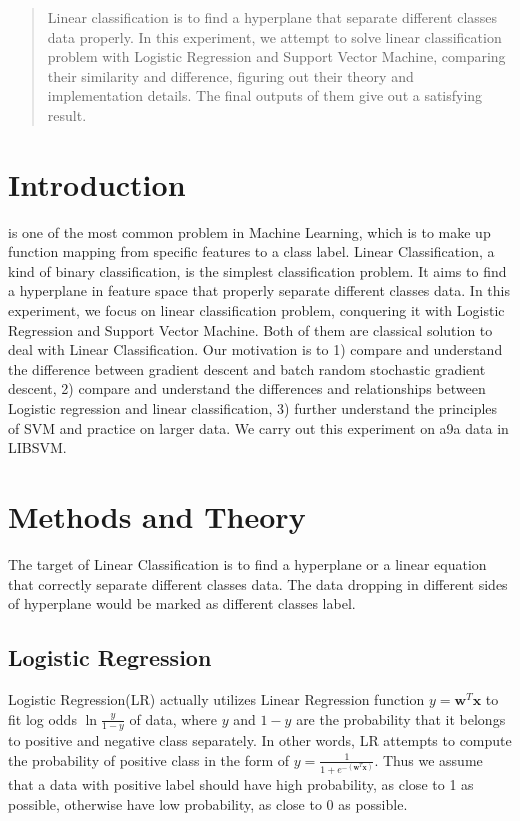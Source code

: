 \documentclass[journal, a4paper]{IEEEtran}
\begin{document}
\begin{abstract}
Linear classification is to find a hyperplane that separate different classes data properly. In this experiment, we attempt to solve linear classification problem with Logistic Regression and Support Vector Machine, comparing their similarity and difference, figuring out their theory and implementation details. The final outputs of them give out a satisfying result.
\end{abstract}

\section{Introduction}
 is one of the most common problem in Machine Learning, which is to make up function mapping from specific features to a class label. Linear Classification, a kind of binary classification, is the simplest classification problem. It aims to find a hyperplane in feature space that properly separate different classes data. In this experiment, we focus on linear classification problem, conquering it with Logistic Regression and Support Vector Machine. Both of them are classical solution to deal with Linear Classification. Our motivation is to 1) compare and understand the difference between gradient descent and batch random stochastic gradient descent, 2) compare and understand the differences and relationships between Logistic regression and linear classification, 3) further understand the principles of SVM and practice on larger data. We carry out this experiment on a9a data in LIBSVM.

\section{Methods and Theory}
The target of Linear Classification is to find a hyperplane or a linear equation that correctly separate different classes data. The data dropping in different sides of hyperplane would be marked as different classes label.
\subsection{Logistic Regression}
Logistic Regression(LR) actually utilizes Linear Regression function $y=\bm{w}^T\bm{x}$ to fit log odds $\ln{\frac{y}{1-y}}$ of data, where $y$ and $1-y$ are the probability that it belongs to positive and negative class separately.
In other words, LR attempts to compute the probability of positive class in the form of $y=\frac{1}{1+e^{-(\bm{w}^T\bm{x})}}$. Thus we assume that a data with positive label should have high probability, as close to 1 as possible, otherwise have low probability, as close to 0 as possible.
\end{document}
